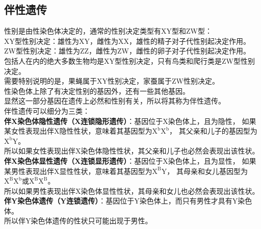 \documentclass[UTF8]{ctexart}
\begin{document}
\subsection{伴性遗传}
    性别是由性染色体决定的，通常的性别决定类型有XY型和ZW型：\\[3mm]
    XY型性别决定：雄性为XY，雌性为XX，雄性的精子对子代性别起决定作用。\\[3mm]
    ZW型性别决定：雄性为ZZ，雌性为ZW，雌性的卵子对子代性别起决定作用。\\[3mm]
    包括人在内的绝大多数生物均是XY型性别决定，只有鸟类和爬行类是ZW型性别决定。\\[3mm]
    需要特别说明的是，果蝇属于XY性别决定，家蚕属于ZW性别决定。\\[9mm]
    性染色体上除了有决定性别的基因外，还有一些其他基因。\\[3mm]
    显然这一部分基因在遗传上必然和性别有关，所以将其称为伴性遗传。\\[6mm]
    伴性遗传可以细分为三类：\\[4mm]
    \textbf{伴X染色体隐性遗传（X连锁隐形遗传）}：基因位于X染色体上，且为隐性，
    如果某女性表现出伴X隐性性状，意味着其基因型为$\text{X}^{\text{b}}\text{X}^{\text{b}}$，
    其父亲和儿子的基因型为$\text{X}^{\text{b}}\text{Y}$。\\[2mm]
    所以如果女性表现出伴X染色体隐性性状，其父亲和儿子也必然会表现出该性状。\\[6mm]
    \textbf{伴X染色体显性遗传（X连锁显形遗传）}：基因位于X染色体上，且为显性，
    如果某男性表现出伴X显性性状，意味着其基因型为$\text{X}^{\text{B}}\text{Y}$，
    其母亲和女儿基因型为$\text{X}^{\text{B}}\text{X}^{\text{b}}$或$\text{X}^{\text{B}}\text{X}^{\text{B}}$。\\[2mm]
    所以如果男性表现出伴X染色体显性性状，其母亲和女儿也必然会表现出该性状。\\[6mm]
    \textbf{伴Y染色体遗传（Y连锁遗传）}：基因位于Y染色体上，而只有男性才具有Y染色体。\\[2mm]
    所以伴Y染色体遗传的性状只可能出现于男性。

\newpage
\end{document}
